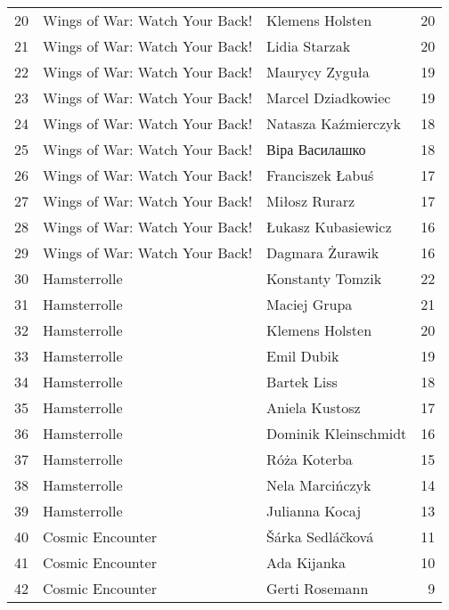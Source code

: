 \begin{table}[h]
\begin{tabular}{rllr}
 20 & Wings of War: Watch Your Back! & Klemens Holsten       &      20 \\
 21 & Wings of War: Watch Your Back! & Lidia Starzak         &      20 \\
 22 & Wings of War: Watch Your Back! & Maurycy Zyguła        &      19 \\
 23 & Wings of War: Watch Your Back! & Marcel Dziadkowiec    &      19 \\
 24 & Wings of War: Watch Your Back! & Natasza Kaźmierczyk   &      18 \\
 25 & Wings of War: Watch Your Back! & Віра Василашко        &      18 \\
 26 & Wings of War: Watch Your Back! & Franciszek Łabuś      &      17 \\
 27 & Wings of War: Watch Your Back! & Miłosz Rurarz         &      17 \\
 28 & Wings of War: Watch Your Back! & Łukasz Kubasiewicz    &      16 \\
 29 & Wings of War: Watch Your Back! & Dagmara Żurawik       &      16 \\
 30 & Hamsterrolle                   & Konstanty Tomzik      &      22 \\
 31 & Hamsterrolle                   & Maciej Grupa          &      21 \\
 32 & Hamsterrolle                   & Klemens Holsten       &      20 \\
 33 & Hamsterrolle                   & Emil Dubik            &      19 \\
 34 & Hamsterrolle                   & Bartek Liss           &      18 \\
 35 & Hamsterrolle                   & Aniela Kustosz        &      17 \\
 36 & Hamsterrolle                   & Dominik Kleinschmidt  &      16 \\
 37 & Hamsterrolle                   & Róża Koterba          &      15 \\
 38 & Hamsterrolle                   & Nela Marcińczyk       &      14 \\
 39 & Hamsterrolle                   & Julianna Kocaj        &      13 \\
 40 & Cosmic Encounter               & Šárka Sedláčková      &      11 \\
 41 & Cosmic Encounter               & Ada Kijanka           &      10 \\
 42 & Cosmic Encounter               & Gerti Rosemann        &       9 \\

\end{tabular}
\end{table}
